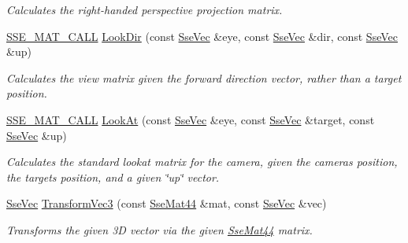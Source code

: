 \begin{DoxyCompactItemize}
\begin{DoxyCompactList}\small\item\em Calculates the right-\/handed perspective projection matrix. \end{DoxyCompactList}\item 
\hyperlink{ssemat__math__defs_8h_a741f88d5589197d03fea9ab2b7622b8a}{S\+S\+E\+\_\+\+M\+A\+T\+\_\+\+C\+A\+L\+L} \hyperlink{namespacegofxmath_a67dc21f3890ac0ef9a36b05b71ad36db}{Look\+Dir} (const \hyperlink{namespacegofxmath_a634570ddcd2496053ee966227080e02f}{Sse\+Vec} \&eye, const \hyperlink{namespacegofxmath_a634570ddcd2496053ee966227080e02f}{Sse\+Vec} \&dir, const \hyperlink{namespacegofxmath_a634570ddcd2496053ee966227080e02f}{Sse\+Vec} \&up)
\begin{DoxyCompactList}\small\item\em Calculates the view matrix given the forward direction vector, rather than a target position. \end{DoxyCompactList}\item 
\hyperlink{ssemat__math__defs_8h_a741f88d5589197d03fea9ab2b7622b8a}{S\+S\+E\+\_\+\+M\+A\+T\+\_\+\+C\+A\+L\+L} \hyperlink{namespacegofxmath_abc7554e34178f4e36a906a12ea469c64}{Look\+At} (const \hyperlink{namespacegofxmath_a634570ddcd2496053ee966227080e02f}{Sse\+Vec} \&eye, const \hyperlink{namespacegofxmath_a634570ddcd2496053ee966227080e02f}{Sse\+Vec} \&target, const \hyperlink{namespacegofxmath_a634570ddcd2496053ee966227080e02f}{Sse\+Vec} \&up)
\begin{DoxyCompactList}\small\item\em Calculates the standard lookat matrix for the camera, given the camera\textquotesingle{}s position, the target\textquotesingle{}s position, and a given \char`\"{}up\char`\"{} vector. \end{DoxyCompactList}\item 
\hyperlink{namespacegofxmath_a634570ddcd2496053ee966227080e02f}{Sse\+Vec} \hyperlink{namespacegofxmath_a7f0f017f89ae1ba6cf642fba6ce8e4cd}{Transform\+Vec3} (const \hyperlink{classgofxmath_1_1_sse_mat44}{Sse\+Mat44} \&mat, const \hyperlink{namespacegofxmath_a634570ddcd2496053ee966227080e02f}{Sse\+Vec} \&vec)
\begin{DoxyCompactList}\small\item\em Transforms the given 3\+D vector via the given \hyperlink{classgofxmath_1_1_sse_mat44}{Sse\+Mat44} matrix. \end{DoxyCompactList}\end{DoxyCompactItemize}

